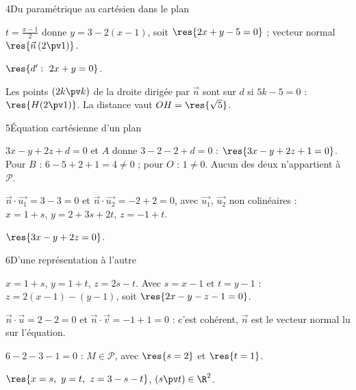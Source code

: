 \begin{deuxcolonnes}
\begin{corrige}{4}{Du paramétrique au cartésien dans le plan}
\begin{questions}
  \item $t=\frac{x-1}{2}$ donne $y=3-2(x-1)$, soit $\res{2x+y-5=0}$ ; vecteur normal $\res{\vec n\,(2\pv1)}$.
  \item $\res{d':\ 2x+y=0}$.
  \item Les points $(2k\pv k)$ de la droite dirigée par $\vec n$ sont sur $d$ si $5k-5=0$ : $\res{H(2\pv1)}$. La distance vaut
    $OH=\res{\sqrt5}$.
\end{questions}
\end{corrige}

\begin{corrige}{5}{Équation cartésienne d'un plan}
\begin{questions}
  \item $3x-y+2z+d=0$ et $A$ donne $3-2-2+d=0$ : $\res{3x-y+2z+1=0}$. Pour $B$ : $6-5+2+1=4\neq0$ ; pour $O$ : $1\neq0$. Aucun
    des deux n'appartient à $\mathcal{P}$.
  \item $\vec n\cdot\vec{u_1}=3-3=0$ et $\vec n\cdot\vec{u_2}=-2+2=0$, avec $\vec{u_1}$, $\vec{u_2}$ non colinéaires :\\
    $x=1+s$, $y=2+3s+2t$, $z=-1+t$.
  \item $\res{3x-y+2z=0}$.
\end{questions}
\end{corrige}

\begin{corrige}{6}{D'une représentation à l'autre}
\begin{questions}
  \item $x=1+s$, $y=1+t$, $z=2s-t$. Avec $s=x-1$ et $t=y-1$ : $z=2(x-1)-(y-1)$, soit $\res{2x-y-z-1=0}$.
  \item $\vec n\cdot\vec u=2-2=0$ et $\vec n\cdot\vec v=-1+1=0$ : c'est cohérent, $\vec n$ est le vecteur normal lu sur l'équation.
  \item $6-2-3-1=0$ : $M\in\mathcal{P}$, avec $\res{s=2}$ et $\res{t=1}$.
  \item $\res{x=s,\ y=t,\ z=3-s-t}$, $(s\pv t)\in\R^2$.
\end{questions}
\end{corrige}


\end{deuxcolonnes}
